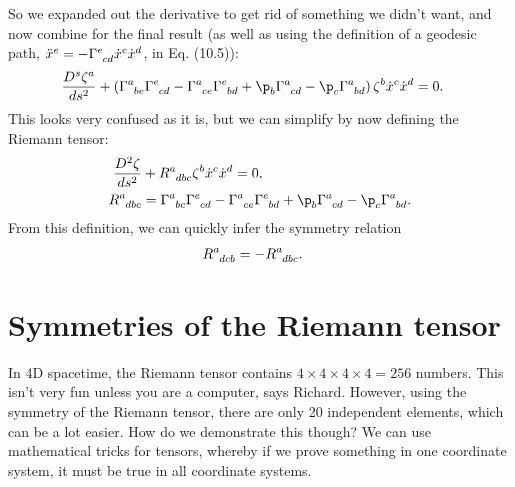 \documentclass[a4paper, 11pt, normalem]{report}
\begin{document}
So we expanded out the derivative to get rid of something we didn't want, and now combine for the final result (as well as using the definition of a geodesic path, $\ddot{x}^e=-\tensor{\Gamma}{^e_{cd}}\dot{x}^c\dot{x}^d$, in Eq. (10.5)):
\begin{align}
    \frac{D^s\zeta^a}{ds^2} &+ \left(\tensor{\Gamma}{^a_{be}}\tensor{\Gamma}{^e_{cd}}-\tensor{\Gamma}{^a_{ce}}\tensor{\Gamma}{^e_{bd}}+\p_b\tensor{\Gamma}{^a_{cd}}-\p_c\tensor{\Gamma}{^a_{bd}}\right)\zeta^b\dot{x}^c\dot{x}^d = 0.
\end{align}
This looks very confused as it is, but we can simplify by now defining the Riemann tensor:
\begin{align}
    \frac{D^2\zeta}{ds^2} &+ \tensor{R}{^a_{dbc}}\zeta^b\dot{x}^c\dot{x}^d = 0,\\
    \tensor{R}{^a_{dbc}} &= \tensor{\Gamma}{^a_{bc}}\tensor{\Gamma}{^e_{cd}} - \tensor{\Gamma}{^a_{ce}}\tensor{\Gamma}{^e_{bd}} + \p_b\tensor{\Gamma}{^a_{cd}}-\p_c\tensor{\Gamma}{^a_{bd}}.
\end{align}
From this definition, we can quickly infer the symmetry relation
\begin{align}
    \tensor{R}{^a_{dcb}} &= -\tensor{R}{^a_{dbc}}.
\end{align}

\section{Symmetries of the Riemann tensor}
In 4D spacetime, the Riemann tensor contains $4\times4\times4\times4 = 256$ numbers.
This isn't very fun unless you are a computer, says Richard.
However, using the symmetry of the Riemann tensor, there are only 20 independent elements, which can be a lot easier.
How do we demonstrate this though?
We can use mathematical tricks for tensors, whereby if we prove something in one coordinate system, it must be true in all coordinate systems.
\end{document}
